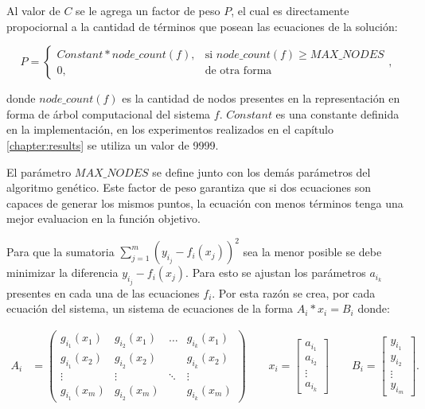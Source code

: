 Al valor de $C$ se le agrega un factor de peso $P$, el cual es directamente propociornal a la cantidad de términos que posean las ecuaciones de la solución:

$$P = \begin{cases}
        Constant * node\_count(f), & \text{si } node\_count(f) \geq MAX\_NODES \\
        0,                         & \text{de otra forma}
    \end{cases},$$

donde $node\_count(f)$ es la cantidad de nodos presentes en la representación en forma de árbol computacional del sistema $f$. $Constant$ es una constante definida en la implementación, en los experimentos realizados en el capítulo \ref{chapter:results} se utiliza un valor de 9999.

El parámetro $MAX\_NODES$ se define junto con los demás parámetros del algoritmo genético. Este factor de peso garantiza que si dos ecuaciones son capaces de generar los mismos puntos, la ecuación con menos términos tenga una mejor evaluacion en la función objetivo.

Para que la sumatoria $\sum_{j=1}^{m}(y_{i_j} - f_i(x_j)) ^ 2$ sea la menor posible se debe minimizar la diferencia $y_{i_j} - f_i(x_j)$. Para esto se ajustan los parámetros $a_{i_k}$ presentes en cada una de las ecuaciones $f_i$. Por esta razón se crea, por cada ecuación del sistema, un sistema de ecuaciones de la forma $A_i * x_i = B_i$ donde:

\begin{align*}
    A_i & = \begin{pmatrix}
        g_{i_1}(x_1) & g_{i_2}(x_1) & \dots  & g_{i_k}(x_1) \\
        g_{i_1}(x_2) & g_{i_2}(x_2) &        & g_{i_k}(x_2) \\
        \vdots       & \vdots       & \ddots & \vdots       \\
        g_{i_1}(x_m) & g_{i_2}(x_m) &        & g_{i_k}(x_m)
    \end{pmatrix}
    \qquad
    x_i = \begin{bmatrix}
        a_{i_1} \\
        a_{i_2} \\
        \vdots  \\
        a_{i_k}
    \end{bmatrix}
    \qquad
    B_i = \begin{bmatrix}
        y_{i_1} \\
        y_{i_2} \\
        \vdots  \\
        y_{i_m}
    \end{bmatrix}.
\end{align*}

